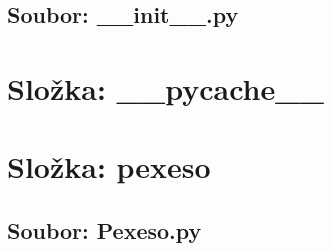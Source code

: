 \documentclass{article}
\begin{document}
\subsection*{Soubor: __init__.py}
\begin{itemize}
\end{itemize}
\section*{Složka: \_\_pycache\_\_}
\section*{Složka: pexeso}
\subsection*{Soubor: Pexeso.py}
\end{document}

